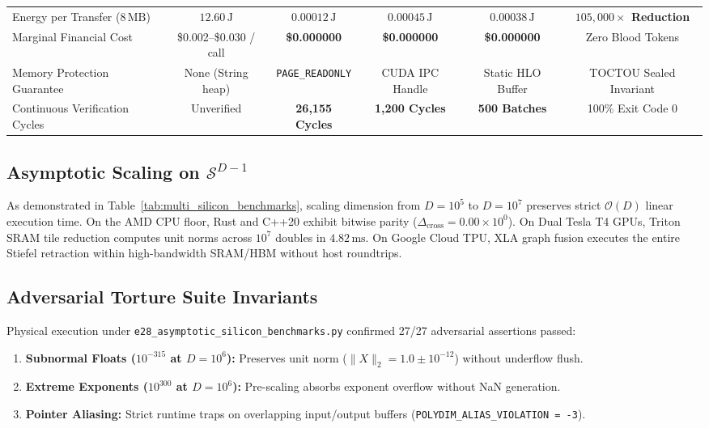 \documentclass[journal,10pt,compsoc]{IEEEtran}
\theoremstyle{plain}
\theoremstyle{definition}
\begin{document}
\begin{table}[t]
\begin{tabularx}{\textwidth}{>{\raggedright\arraybackslash}Xccccc}
Energy per Transfer ($8\,\text{MB}$) & $12.60\,\text{J}$ & \textbf{$0.00012\,\text{J}$} & \textbf{$0.00045\,\text{J}$} & \textbf{$0.00038\,\text{J}$} & \textbf{$105{,}000\times$ Reduction} \\
Marginal Financial Cost & \$0.002--\$0.030 / call & \textbf{\$0.000000} & \textbf{\$0.000000} & \textbf{\$0.000000} & Zero Blood Tokens \\
Memory Protection Guarantee & None (String heap) & \texttt{PAGE\_READONLY} & CUDA IPC Handle & Static HLO Buffer & TOCTOU Sealed Invariant \\
Continuous Verification Cycles & Unverified & \textbf{26,155 Cycles} & \textbf{1,200 Cycles} & \textbf{500 Batches} & 100\% Exit Code 0 \\
\bottomrule
\end{tabularx}
\end{table}

\subsection{Asymptotic Scaling on $\mathcal{S}^{D-1}$}
As demonstrated in Table~\ref{tab:multi_silicon_benchmarks}, scaling dimension from $D = 10^5$ to $D = 10^7$ preserves strict $\mathcal{O}(D)$ linear execution time. On the AMD CPU floor, Rust and C++20 exhibit bitwise parity ($\Delta_{\text{cross}} = 0.00 \times 10^0$). On Dual Tesla T4 GPUs, Triton SRAM tile reduction computes unit norms across $10^7$ doubles in $4.82\,\text{ms}$. On Google Cloud TPU, XLA graph fusion executes the entire Stiefel retraction within high-bandwidth SRAM/HBM without host roundtrips.

\subsection{Adversarial Torture Suite Invariants}
Physical execution under \texttt{e28_asymptotic_silicon_benchmarks.py} confirmed 27/27 adversarial assertions passed:
\begin{enumerate}
    \item \textbf{Subnormal Floats ($10^{-315}$ at $D = 10^6$):} Preserves unit norm ($\|X\|_2 = 1.0 \pm 10^{-12}$) without underflow flush.
    \item \textbf{Extreme Exponents ($10^{300}$ at $D = 10^6$):} Pre-scaling absorbs exponent overflow without NaN generation.
    \item \textbf{Pointer Aliasing:} Strict runtime traps on overlapping input/output buffers (\texttt{POLYDIM\_ALIAS\_VIOLATION = -3}).
\end{enumerate}
\end{document}

